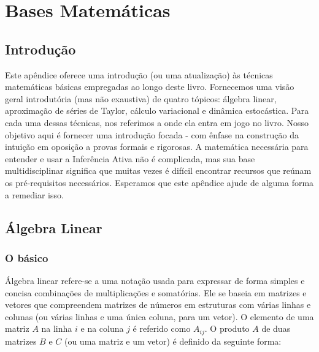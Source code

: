 \documentclass[
  12pt,
]{book}
\begin{document}
\cleardoublepage

\hypertarget{appendix-apuxeandice}{%
\appendix}


\hypertarget{bases-matemuxe1ticas}{%
\chapter{Bases Matemáticas}\label{bases-matemuxe1ticas}}

\hypertarget{introduuxe7uxe3o-9}{%
\section{Introdução}\label{introduuxe7uxe3o-9}}

Este apêndice oferece uma introdução (ou uma atualização) às técnicas matemáticas básicas empregadas ao longo deste livro. Fornecemos uma visão geral introdutória (mas não exaustiva) de quatro tópicos: álgebra linear, aproximação de séries de Taylor, cálculo variacional e dinâmica estocástica. Para cada uma dessas técnicas, nos referimos a onde ela entra em jogo no livro. Nosso objetivo aqui é fornecer uma introdução focada - com ênfase na construção da intuição em oposição a provas formais e rigorosas. A matemática necessária para entender e usar a Inferência Ativa não é complicada, mas sua base multidisciplinar significa que muitas vezes é difícil encontrar recursos que reúnam os pré-requisitos necessários. Esperamos que este apêndice ajude de alguma forma a remediar isso.

\hypertarget{uxe1lgebra-linear}{%
\section{Álgebra Linear}\label{uxe1lgebra-linear}}

\hypertarget{o-buxe1sico}{%
\subsection{O básico}\label{o-buxe1sico}}

Álgebra linear refere-se a uma notação usada para expressar de forma simples e concisa combinações de multiplicações e somatórias. Ele se baseia em matrizes e vetores que compreendem matrizes de números em estruturas com várias linhas e colunas (ou várias linhas e uma única coluna, para um vetor). O elemento de uma matriz \(A\) na linha \(i\) e na coluna \(j\) é referido como \(A_{ij}\). O produto \(A\) de duas matrizes \(B\) e \(C\) (ou uma matriz e um vetor) é definido da seguinte forma:
\end{document}
